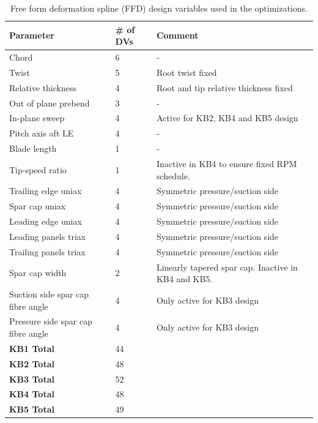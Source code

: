 \begin{table}[pth]
\centering
\caption{Free form deformation spline (FFD) design variables used in the optimizations.}
\small
\begin{tabular}{lll}
\hline
\textbf{Parameter}		&	\# of DVs			& \textbf{Comment}	\\
\hline
Chord					&	6	&	-	\\
Twist					&	5	&	Root twist fixed	\\
Relative thickness		&	4	& 	Root and tip relative thickness fixed	\\
Out of plane prebend		&	3	& 	- \\
In-plane sweep			&	4	&	Active for KB2, KB4 and KB5 design \\
Pitch axis aft LE		&	4	& 	- \\
Blade length				&	1	&	- \\
Tip-speed ratio			&	1	&	Inactive in KB4 to ensure fixed RPM schedule. \\
Trailing edge uniax		&	4	&	Symmetric pressure/suction side	\\
Spar cap uniax			&	4	&	Symmetric pressure/suction side	\\
Leading edge uniax		&	4	&	Symmetric pressure/suction side	\\
Leading panels triax		&	4	&	Symmetric pressure/suction side	\\
Trailing panels triax	&	4	&	Symmetric pressure/suction side	\\
Spar cap width			& 	2	&	Linearly tapered spar cap. Inactive in KB4 and KB5. \\
Suction side spar cap fibre angle	&	4	&	Only active for KB3 design	\\
Pressure side spar cap fibre angle	&	4	&	Only active for KB3 design	\\
\hline
\textbf{KB1 Total}		&	44	&	\\
\textbf{KB2 Total}		&	48	&	\\
\textbf{KB3 Total}		&	52	&	\\
\textbf{KB4 Total}		&	48	&	\\
\textbf{KB5 Total}		&	49	&	\\
\hline
\end{tabular}
\label{tab:dv_summary}
\end{table}

